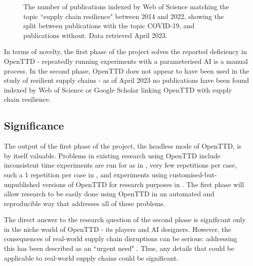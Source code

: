 \documentclass[a4paper,11pt]{article}
\begin{document}
\begin{figure}[h]
\centering
{}
\caption{The number of publications indexed by Web of Science matching the topic ``supply chain resilience" between 2014 and 2022, showing the split between publications with the topic COVID-19, and publications without. Data retrieved April 2023.}
\label{fig:supplychainresiliance}
\end{figure}

In terms of novelty, the first phase of the project solves the reported \cite{openttdNoHeadless} deficiency in OpenTTD - repeatedly running experiments with a parameterised AI is a manual process. In the second phase, OpenTTD does not appear to have been used in the study of resilient supply chains - as of April 2023 no publications have been found indexed by Web of Science or Google Scholar linking OpenTTD with supply chain resilience.

\subsection{Significance}

The output of the first phase of the project, the headless mode of OpenTTD, is by itself valuable. Problems in existing research using OpenTTD include inconsistent time experiments are run for as in \cite{rios_trains_2009}, very few repetitions per case, such a 1 repetition per case in \cite{wisniewski_artificial}, and experiments using customised-but-unpublished versions of OpenTTD for research purposes in \cite{shen_rtsenv_2011, konijnendijk2015mcts}. The first phase will allow research to be easily done using OpenTTD in an automated and reproducible way that addresses all of these problems. 

The direct answer to the research question of the second phase is significant only in the  niche world of OpenTTD - its players and AI designers. However, the consequences of real-world supply chain disruptions can be serious: addressing this has been described as an ``urgent need" \cite{moosavi_supply_2022}. Thus, any details that could be applicable to real-world supply chains could be significant.
\end{document}
